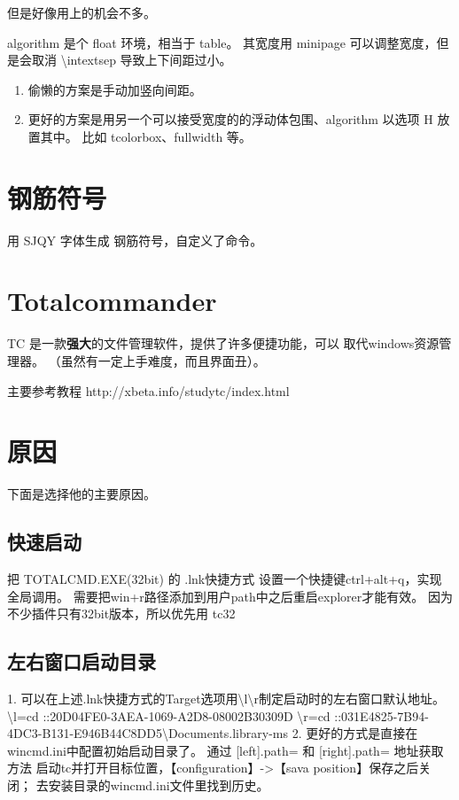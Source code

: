 \documentclass[UTF8,AutoFakeBold,zihao=-4,scheme=chinese]{ctexart}
\begin{document}
但是好像用上的机会不多。

algorithm 是个 float 环境，相当于 table。
其宽度用 minipage 可以调整宽度，但是会取消 \textbackslash intextsep 导致上下间距过小。

\begin{enumerate}[(1)]
  \item 偷懒的方案是手动加竖向间距。
  \item 更好的方案是用另一个可以接受宽度的的浮动体包围、algorithm 以选项 H 放置其中。
  比如 tcolorbox、fullwidth 等。
\end{enumerate}

\section{钢筋符号}
用 SJQY 字体生成 钢筋符号，自定义了命令。
\stA
\stB
\stC
\stD
\stE

\section{Totalcommander}

TC 是一款\textbf{强大}的文件管理软件，提供了许多便捷功能，可以 取代windows资源管理器。
（虽然有一定上手难度，而且界面丑）。

主要参考教程 http://xbeta.info/studytc/index.html

\section{原因}
下面是选择他的主要原因。
\subsection{ 快速启动 }
把 TOTALCMD.EXE(32bit) 的 .lnk快捷方式 设置一个快捷键ctrl+alt+q，实现全局调用。
需要把win+r路径添加到用户path中之后重启explorer才能有效。
因为不少插件只有32bit版本，所以优先用 tc32

\subsection{ 左右窗口启动目录}
1. 可以在上述.lnk快捷方式的Target选项用\textbackslash l\textbackslash r制定启动时的左右窗口默认地址。
\textbackslash l=cd ::{20D04FE0-3AEA-1069-A2D8-08002B30309D}
\textbackslash r=cd ::{031E4825-7B94-4DC3-B131-E946B44C8DD5}\textbackslash Documents.library-ms
2. 更好的方式是直接在wincmd.ini中配置初始启动目录了。
通过 [left].path= 和 [right].path=
地址获取方法
启动tc并打开目标位置，【configuration】->【sava position】保存之后关闭；
去安装目录的wincmd.ini文件里找到历史。
\end{document}
